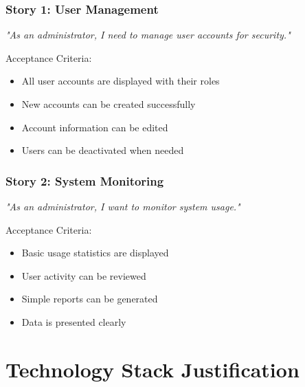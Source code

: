 \documentclass[12pt,a4paper]{article}
\newcommand{\sectionbreak}{\vspace{0.5cm}}
\begin{document}
\subsubsection{Story 1: User Management}

\begin{center}
    \textit{"As an administrator, I need to manage user accounts for security."}

\end{center}

Acceptance Criteria:
\begin{itemize}[itemsep=0.1cm]
    \item All user accounts are displayed with their roles
    \item New accounts can be created successfully
    \item Account information can be edited
    \item Users can be deactivated when needed
\end{itemize}

\subsubsection{Story 2: System Monitoring}

\begin{center}
    \textit{"As an administrator, I want to monitor system usage."}

\end{center}

Acceptance Criteria:
\begin{itemize}[itemsep=0.1cm]
    \item Basic usage statistics are displayed
    \item User activity can be reviewed
    \item Simple reports can be generated
    \item Data is presented clearly
\end{itemize}

\sectionbreak

\section{Technology Stack Justification}
\end{document}
